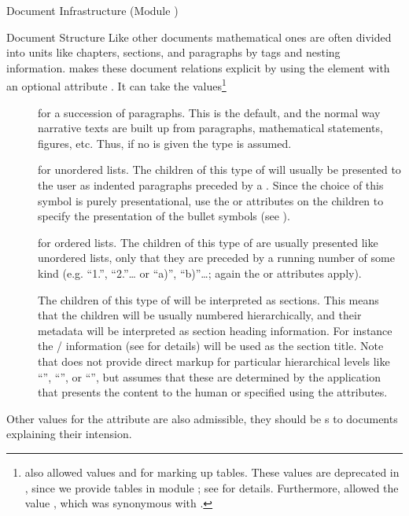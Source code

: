 \begin{tchapter}[id=omdoc-infrastructure,short=Document Infrastructure]{Document Infrastructure (Module {})}
\begin{tsection}[id=sectioning]{Document Structure}
  Like other documents mathematical ones are often divided into units like chapters,
  sections, and paragraphs by tags and nesting information. {\omdoc} makes these document
  relations explicit by using the {} element with an optional attribute
  {}. It can take the values\footnote{{} also allowed
    values {} and
    {} for marking up tables.  These values
    are deprecated in {}, since we provide tables in module {};
    see {} for details. Furthermore, {} allowed the value
    {}, which was synonymous with
    {}.}
\begin{description}
\item[] for a succession of paragraphs. This is the
  default, and the normal way narrative texts are built up from paragraphs, mathematical
  statements, figures, etc. Thus, if no {} is given the type
  {} is assumed.
\item[] for unordered lists. The children of this type of
  {} will usually be presented to the user as indented paragraphs
  preceded by a {}. Since the choice of this symbol is purely
  presentational, {\omdoc} use the {\css} {} or
  {} attributes on the children to specify the
  presentation of the bullet symbols (see {}).
\item[] for ordered lists. The children of this
  type of {} are usually presented like unordered lists, only
  that they are preceded by a running number of some kind (e.g. ``1.'', ``2.''\ldots
  or ``a)'', ``b)''\ldots; again the
  {} or {} attributes apply).
\item[] The children of this type of
  {} will be interpreted as sections. This means that the
  children will be usually numbered hierarchically, and their metadata will be
  interpreted as section heading information. For instance the
  {}/{} information (see {}
  for details) will be used as the section title. Note that {\omdoc} does not
  provide direct markup for particular hierarchical levels like
  ``{}'', ``{}'', or
  ``{}'', but assumes that these are determined by the
  application that presents the content to the human or specified using the {\css}
  attributes.
\end{description}
Other values for the {} attribute are also admissible, they should be
{s} to documents explaining their intension.
  

\end{tsection}
\end{tchapter}
